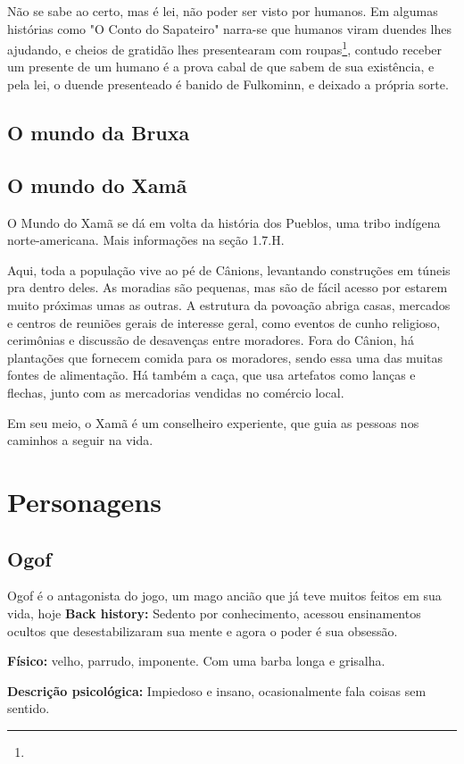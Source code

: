 Não se sabe ao certo, mas é lei, não poder ser visto por humanos. Em algumas histórias como "O Conto do Sapateiro" narra-se que humanos viram duendes lhes ajudando, e cheios de gratidão lhes presentearam com roupas\footnote{}, contudo receber um presente de um humano é a prova cabal de que sabem de sua existência, e pela lei, o duende presenteado é banido de Fulkominn, e deixado a própria sorte.

\subsection{O mundo da Bruxa}
\subsection{O mundo do Xamã}
O Mundo do Xamã se dá em volta da história dos Pueblos, uma tribo indígena norte-americana. Mais informações na seção 1.7.H.

Aqui, toda a população vive ao pé de Cânions, levantando construções em túneis pra dentro deles. As moradias são pequenas, mas são de fácil acesso por estarem muito próximas umas as outras. A estrutura da povoação abriga casas, mercados e centros de reuniões gerais de interesse geral, como eventos de cunho religioso, cerimônias e discussão de desavenças entre moradores. Fora do Cânion, há plantações que fornecem comida para os moradores, sendo essa uma das muitas fontes de alimentação. Há também a caça, que usa artefatos como lanças e flechas, junto com as mercadorias vendidas no comércio local.

Em seu meio, o Xamã é um conselheiro experiente, que guia as pessoas nos caminhos a seguir na vida.
\section{Personagens}
\subsection{Ogof}
Ogof é o antagonista do jogo, um mago ancião que já teve muitos feitos em sua vida, hoje 
\textbf{Back history: }Sedento por conhecimento, acessou ensinamentos ocultos que desestabilizaram sua mente e agora o poder é sua obsessão.

\textbf{Físico:} velho, parrudo, imponente. Com uma barba longa e grisalha.

\textbf{Descrição psicológica:} Impiedoso e insano, ocasionalmente fala coisas sem sentido.

